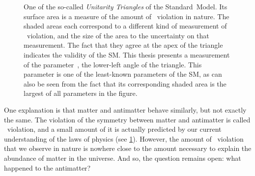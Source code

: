 \begin{figure}[htb]
    \caption{
        One of the so-called \emph{Unitarity Triangles} of the Standard~Model.
        Its surface area is a measure of the amount of \CP~violation in nature.
        The shaded areas each correspond to a different kind of measurement of \CP~violation, and the size of the area to the uncertainty on that measurement.
        The fact that they agree at the apex of the triangle indicates the validity of the SM.
        This thesis presents a measurement of the parameter~\CPgamma, the lower-left angle of the triangle.
        This parameter is one of the least-known parameters of the SM, as can also be seen from the fact that its corresponding shaded area is the largest of all parameters in the figure.}
    \label{fig:summary_UT}
\end{figure}
%
One explanation is that matter and antimatter behave similarly, but not exactly the same.
The violation of the symmetry between matter and antimatter is called \CP~violation, and a small amount of it is actually predicted by our current understanding of the laws of physics (see \cref{fig:summary_UT}).
However, the amount of \CP~violation that we observe in nature is nowhere close to the amount necessary to explain the abundance of matter in the universe.
And so, the question remains open: what happened to the antimatter?

